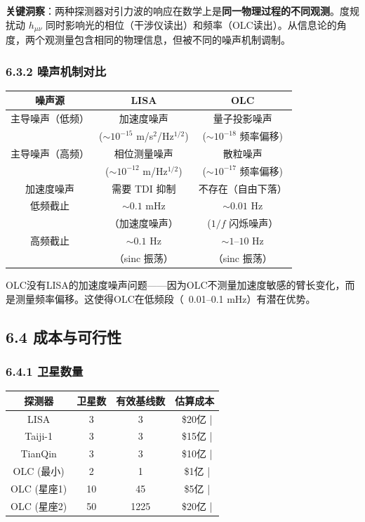 \documentclass[12pt,a4paper]{article}
\begin{document}
\textbf{关键洞察}：两种探测器对引力波的响应在数学上是\textbf{同一物理过程的不同观测}。度规扰动 $h_{\mu\nu}$ 同时影响光的相位（干涉仪读出）和频率（OLC读出）。从信息论的角度，两个观测量包含相同的物理信息，但被不同的噪声机制调制。

\subsubsection{6.3.2 噪声机制对比}


\begin{tabular}{|c|c|c|}
\hline
噪声源 & LISA & OLC \\
\hline
主导噪声（低频） & 加速度噪声 & 量子投影噪声 \\
  & ($\sim 10^{-15}$ m/s$^2$/Hz$^{1/2}$) & ($\sim 10^{-18}$ 频率偏移) \\
主导噪声（高频） & 相位测量噪声 & 散粒噪声 \\
  & ($\sim 10^{-12}$ m/Hz$^{1/2}$) & ($\sim 10^{-17}$ 频率偏移) \\
加速度噪声 & 需要 TDI 抑制 & 不存在（自由下落） \\
低频截止 & $\sim 0.1$ mHz & $\sim 0.01$ Hz \\
  & （加速度噪声） & ($1/f$ 闪烁噪声） \\
高频截止 & $\sim 0.1$ Hz & $\sim 1$--$10$ Hz \\
  & （sinc 振荡） & （sinc 振荡） \\
\hline
\end{tabular}


OLC没有LISA的加速度噪声问题——因为OLC不测量加速度敏感的臂长变化，而是测量频率偏移。这使得OLC在低频段（~0.01–0.1 mHz）有潜在优势。

\subsection{6.4 成本与可行性}


\subsubsection{6.4.1 卫星数量}


\begin{tabular}{|c|c|c|c|}
\hline
探测器 & 卫星数 & 有效基线数 & 估算成本 \\
\hline
LISA & 3 & 3 & ~\$20亿 | \\
Taiji-1 & 3 & 3 & ~\$15亿 | \\
TianQin & 3 & 3 & ~\$10亿 | \\
OLC (最小) & 2 & 1 & ~\$1亿 | \\
OLC (星座1) & 10 & 45 & ~\$5亿 | \\
OLC (星座2) & 50 & 1225 & ~\$20亿 | \\
\hline
\end{tabular}
\end{document}
